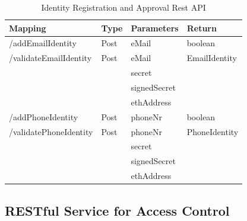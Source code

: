 \begin{table}[H]
\caption{Identity Registration and Approval Rest API}
\label{tab:Identity-Reg-Rest-API}

\begin{tabular} { | m{} |m{}|m{}|m{} | }
\hline
Mapping & Type & Parameters & Return \\
\hline
  /addEmailIdentity & Post & eMail & boolean \\ 
\hline
/validateEmailIdentity & Post & eMail  & EmailIdentity \\ 
& &secret  & \\
& & signedSecret  & \\
& & ethAddress & \\
\hline
/addPhoneIdentity   & Post & phoneNr & boolean \\ 
\hline
/validatePhoneIdentity & Post & phoneNr & PhoneIdentity \\ 
& &secret  & \\
& & signedSecret  & \\
& & ethAddress & \\
\hline
\end{tabular}

\end{table}


\subsection{RESTful Service for Access Control}
